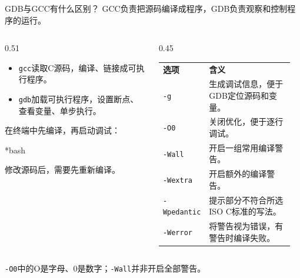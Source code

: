 \begin{frame}{GDB与GCC有什么区别？}
    \alert{GCC负责把源码编译成程序，GDB负责观察和控制程序的运行。}
    \medskip
    \begin{columns}[T]
        \begin{column}{0.51\textwidth}
            \small
            \begin{itemize}
                \item \texttt{gcc}读取C源码，编译、链接成可执行程序。
                \item \texttt{gdb}加载可执行程序，设置断点、查看变量、单步执行。
            \end{itemize}
            \medskip
            在终端中\alert{先编译，再启动调试}：
            \begin{Code}*{bash}
                
            \end{Code}
            修改源码后，需要先重新编译。
        \end{column}
        \begin{column}{0.45\textwidth}
            \small
            \renewcommand{\arraystretch}{1.25}
            \begin{tabular}{@{}p{0.27\linewidth}p{0.65\linewidth}@{}}
                \textbf{选项} & \textbf{含义} \\
                \texttt{-g} & 生成调试信息，便于GDB定位源码和变量。 \\
                \texttt{-O0} & 关闭优化，便于逐行调试。 \\
                \texttt{-Wall} & 开启一组常用编译警告。 \\
                \texttt{-Wextra} & 开启额外的编译警告。 \\
                \texttt{-Wpedantic} & 提示部分不符合所选ISO C标准的写法。 \\
                \texttt{-Werror} & 将警告视为错误，有警告时编译失败。
            \end{tabular}
        \end{column}
    \end{columns}
    \medskip
    \footnotesize \texttt{-O0}中的O是字母、0是数字；\texttt{-Wall}并非开启全部警告。
\end{frame}

